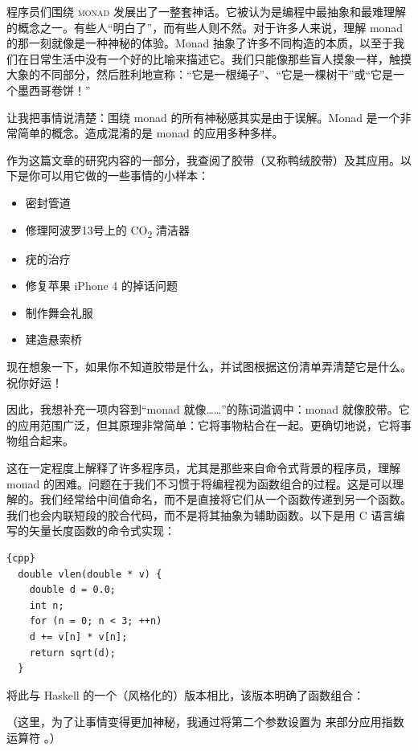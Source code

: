 
\lettrine[lhang=0.17]{程}{序员们围绕 monad} 发展出了一整套神话。它被认为是编程中最抽象和最难理解的概念之一。有些人“明白了”，而有些人则不然。对于许多人来说，理解 monad 的那一刻就像是一种神秘的体验。Monad 抽象了许多不同构造的本质，以至于我们在日常生活中没有一个好的比喻来描述它。我们只能像那些盲人摸象一样，触摸大象的不同部分，然后胜利地宣称：“它是一根绳子”、“它是一棵树干”或“它是一个墨西哥卷饼！”

让我把事情说清楚：围绕 monad 的所有神秘感其实是由于误解。Monad 是一个非常简单的概念。造成混淆的是 monad 的应用多种多样。

作为这篇文章的研究内容的一部分，我查阅了胶带（又称鸭绒胶带）及其应用。以下是你可以用它做的一些事情的小样本：

\begin{itemize}
  \tightlist
  \item 密封管道
  \item 修理阿波罗13号上的 CO\textsubscript{2} 清洁器
  \item 疣的治疗
  \item 修复苹果 iPhone 4 的掉话问题
  \item 制作舞会礼服
  \item 建造悬索桥
\end{itemize}

\noindent
现在想象一下，如果你不知道胶带是什么，并试图根据这份清单弄清楚它是什么。祝你好运！

因此，我想补充一项内容到“monad 就像……”的陈词滥调中：monad 就像胶带。它的应用范围广泛，但其原理非常简单：它将事物粘合在一起。更确切地说，它将事物组合起来。

这在一定程度上解释了许多程序员，尤其是那些来自命令式背景的程序员，理解 monad 的困难。问题在于我们不习惯于将编程视为函数组合的过程。这是可以理解的。我们经常给中间值命名，而不是直接将它们从一个函数传递到另一个函数。我们也会内联短段的胶合代码，而不是将其抽象为辅助函数。以下是用 C 语言编写的矢量长度函数的命令式实现：

\begin{lstlisting}{cpp}
  double vlen(double * v) {
    double d = 0.0;
    int n;
    for (n = 0; n < 3; ++n)
    d += v[n] * v[n];
    return sqrt(d);
  }
\end{lstlisting}
将此与 Haskell 的一个（风格化的）版本相比，该版本明确了函数组合：

（这里，为了让事情变得更加神秘，我通过将第二个参数设置为  来部分应用指数运算符 \code{(\^{})}。）

